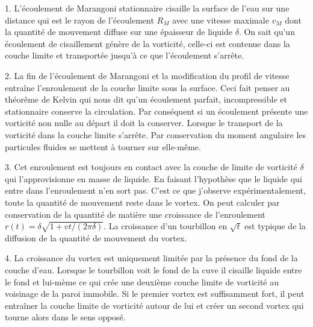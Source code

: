 \documentclass[french, 10pt]{article}
\begin{document}
1. L'écoulement de Marangoni stationnaire cisaille la surface de l'eau sur une distance qui est le rayon de l'écoulement $R_M$ avec une vitesse maximale $v_M$ dont la quantité de mouvement diffuse sur une épaisseur de liquide $\delta$. On sait qu'un écoulement de cisaillement génère de la vorticité, celle-ci est contenue dans la couche limite et transportée jusqu'à ce que l'écoulement s'arrête.\medskip 

2. La fin de l'écoulement de Marangoni et la modification du profil de vitesse entraîne l'enroulement de la couche limite sous la surface. Ceci fait penser au théorême de Kelvin qui nous dit qu'un écoulement parfait, incompressible et stationnaire conserve la circulation. Par conséquent si un écoulement présente une vorticité non nulle au départ il doit la conserver. Lorsque le transport de la vorticité dans la couche limite s'arrête. Par conservation du moment angulaire les particules fluides se mettent à tourner sur elle-même.\medskip

3. Cet enroulement est toujours en contact avec la couche de limite de vorticité $\delta$ qui l'approvisionne en masse de liquide. En faisant l'hypothèse que le liquide qui entre dans l'enroulement n'en sort pas. C'est ce que j'observe expérimentalement, toute la quantité de mouvement reste dans le vortex. On peut calculer par conservation de la quantité de matière une croissance de l'enroulement $r(t)=\delta\sqrt{1+vt/(2\pi\delta)}$. La croissance d'un tourbillon en $\sqrt{t}$ est typique de la diffusion de la quantité de mouvement du vortex.\medskip

4. La croissance du vortex est uniquement limitée par la présence du fond de la couche d'eau. Lorsque le tourbillon \og{}voit\fg{} le fond de la cuve il cisaille liquide entre le fond et lui-mème ce qui crée une deuxième couche limite de vorticité au voisinage de la paroi immobile. Si le premier vortex est suffisamment fort, il peut entraîner la couche limite de vorticité autour de lui et créer un second vortex qui tourne alors dans le sens opposé.\medskip 
\end{document}
